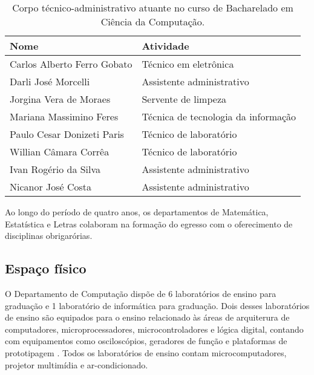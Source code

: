 \begin{table}[htb!]
\centering
\begin{tabular}{|l|l|} \hline
\textbf{Nome} & \textbf{Atividade} \\ \hline
Carlos Alberto Ferro Gobato & Técnico em eletrônica \\ \hline
Darli José Morcelli & Assistente administrativo \\ \hline
Jorgina Vera de Moraes & Servente de limpeza \\ \hline
Mariana Massimino Feres & Técnica de tecnologia da informação \\ \hline
Paulo Cesar Donizeti Paris & Técnico de laboratório \\ \hline
Willian Câmara Corrêa & Técnico de laboratório \\ \hline
Ivan Rogério da Silva & Assistente administrativo \\ \hline
Nicanor José Costa & Assistente administrativo \\ \hline
\end{tabular}
\caption{Corpo técnico-administrativo atuante no curso de Bacharelado em Ciência da Computação.}
\label{table:CorpoTecnico}
\end{table}



Ao longo do período de quatro anos, os departamentos de Matemática, Estatística e Letras colaboram na formação do egresso com o oferecimento de disciplinas obrigarórias.


\subsection{Espaço físico}

O Departamento de Computação dispõe de 6 laboratórios de ensino para graduação e 1 laboratório de informática para graduação. Dois desses laboratórios de ensino são equipados para o ensino relacionado às áreas de arquiterura de computadores, microprocessadores, microcontroladores e lógica digital, contando com equipamentos como osciloscópios, geradores de função e plataformas de prototipagem . Todos os laboratórios de ensino contam microcomputadores, projetor multimídia e ar-condicionado.  

